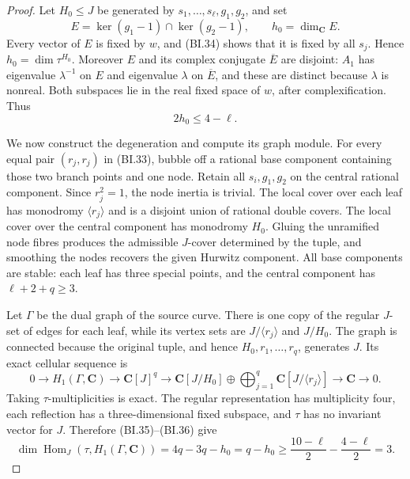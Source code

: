 \begin{proof}
Let $H_0\le J$ be generated by
$s_1,\ldots,s_\ell,g_1,g_2$, and set
\[
 E=\ker(g_1-1)\cap\ker(g_2-1),\qquad h_0=\dim_{\mathbf C}E.
\]
Every vector of $E$ is fixed by $w$, and (BI.34) shows that it
is fixed by all $s_j$.  Hence $h_0=\dim\tau^{H_0}$.
Moreover $E$ and its complex conjugate $\overline E$ are disjoint:
$A_1$ has eigenvalue $\lambda^{-1}$ on $E$ and eigenvalue
$\lambda$ on $\overline E$, and these are distinct because
$\lambda$ is nonreal.  Both subspaces lie in the real fixed space
of $w$, after complexification.  Thus
\[
                         2h_0\le4-\ell.                    \tag{BI.35}
\]

We now construct the degeneration and compute its graph module.
For every equal pair $(r_j,r_j)$ in (BI.33), bubble off a rational
base component containing those two branch points and one node.
Retain all $s_i,g_1,g_2$ on the central rational component.
Since $r_j^2=1$, the node inertia is trivial.  The local cover over
each leaf has monodromy $\langle r_j\rangle$ and is a disjoint
union of rational double covers.  The local cover over the central
component has monodromy $H_0$.  Gluing the unramified node fibres
produces the admissible $J$-cover determined by the tuple, and
smoothing the nodes recovers the given Hurwitz component.  All
base components are stable: each leaf has three special points,
and the central component has $\ell+2+q\ge3$.

Let $\Gamma$ be the dual graph of the source curve.  There is one
copy of the regular $J$-set of edges for each leaf, while its vertex
sets are $J/\langle r_j\rangle$ and $J/H_0$.  The graph is
connected because the original tuple, and hence
$H_0,r_1,\ldots,r_q$, generates $J$.  Its exact cellular sequence is
\[
 0\longrightarrow H_1(\Gamma,\mathbf C)
 \longrightarrow\mathbf C[J]^q
 \longrightarrow\mathbf C[J/H_0]\oplus
       \bigoplus_{j=1}^{q}\mathbf C[J/\langle r_j\rangle]
 \longrightarrow\mathbf C\longrightarrow0.
                                                               \tag{BI.36}
\]
Taking $\tau$-multiplicities is exact.  The regular representation
has multiplicity four, each reflection has a three-dimensional
fixed subspace, and $\tau$ has no invariant vector for $J$.
Therefore (BI.35)--(BI.36) give
\[
 \dim\operatorname{Hom}_J(\tau,H_1(\Gamma,\mathbf C))
       =4q-3q-h_0=q-h_0
       \ge\frac{10-\ell}{2}-\frac{4-\ell}{2}=3.
                                                               \tag{BI.37}
\]


\end{proof}
